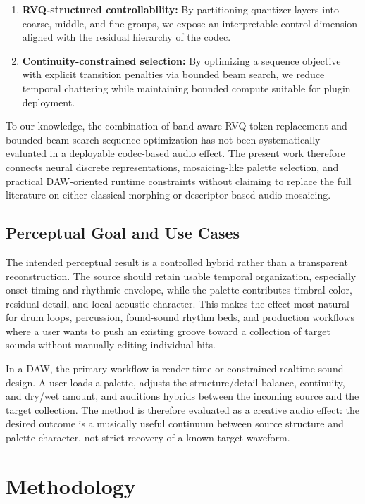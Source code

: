 \documentclass[twoside,a4paper]{article}
\begin{document}
\begin{enumerate}
    \item \textbf{RVQ-structured controllability:} By partitioning quantizer layers into coarse, middle, and fine groups, we expose an interpretable control dimension aligned with the residual hierarchy of the codec.
    \item \textbf{Continuity-constrained selection:} By optimizing a sequence objective with explicit transition penalties via bounded beam search, we reduce temporal chattering while maintaining bounded compute suitable for plugin deployment.
\end{enumerate}

To our knowledge, the combination of band-aware RVQ token replacement and bounded beam-search sequence optimization has not been systematically evaluated in a deployable codec-based audio effect. The present work therefore connects neural discrete representations, mosaicing-like palette selection, and practical DAW-oriented runtime constraints without claiming to replace the full literature on either classical morphing or descriptor-based audio mosaicing.

\subsection{Perceptual Goal and Use Cases}

The intended perceptual result is a controlled hybrid rather than a transparent reconstruction. The source should retain usable temporal organization, especially onset timing and rhythmic envelope, while the palette contributes timbral color, residual detail, and local acoustic character. This makes the effect most natural for drum loops, percussion, found-sound rhythm beds, and production workflows where a user wants to push an existing groove toward a collection of target sounds without manually editing individual hits.

In a DAW, the primary workflow is render-time or constrained realtime sound design. A user loads a palette, adjusts the structure/detail balance, continuity, and dry/wet amount, and auditions hybrids between the incoming source and the target collection. The method is therefore evaluated as a creative audio effect: the desired outcome is a musically useful continuum between source structure and palette character, not strict recovery of a known target waveform.


\section{Methodology}\label{sec:method}
\end{document}
